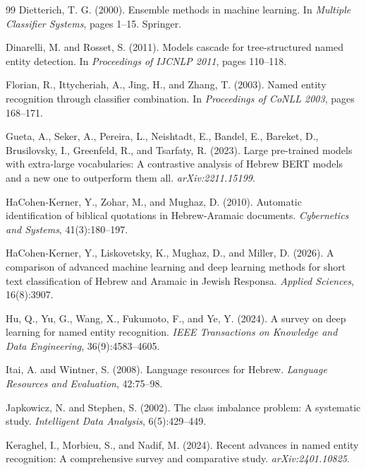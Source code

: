 \documentclass[11pt,a4paper]{article}
\begin{document}
\begin{thebibliography}{99}
Dietterich, T. G. (2000).
Ensemble methods in machine learning.
In \emph{Multiple Classifier Systems}, pages 1--15. Springer.

Dinarelli, M. and Rosset, S. (2011).
Models cascade for tree-structured named entity detection.
In \emph{Proceedings of IJCNLP 2011}, pages 110--118.

Florian, R., Ittycheriah, A., Jing, H., and Zhang, T. (2003).
Named entity recognition through classifier combination.
In \emph{Proceedings of CoNLL 2003}, pages 168--171.

Gueta, A., Seker, A., Pereira, L., Neishtadt, E., Bandel, E., Bareket, D., Brusilovsky, I., Greenfeld, R., and Tsarfaty, R. (2023).
Large pre-trained models with extra-large vocabularies: A contrastive analysis of Hebrew BERT models and a new one to outperform them all.
\emph{arXiv:2211.15199}.

HaCohen-Kerner, Y., Zohar, M., and Mughaz, D. (2010).
Automatic identification of biblical quotations in Hebrew-Aramaic documents.
\emph{Cybernetics and Systems}, 41(3):180--197.

HaCohen-Kerner, Y., Liskovetsky, K., Mughaz, D., and Miller, D. (2026).
A comparison of advanced machine learning and deep learning methods for short text classification of Hebrew and Aramaic in Jewish Responsa.
\emph{Applied Sciences}, 16(8):3907.

Hu, Q., Yu, G., Wang, X., Fukumoto, F., and Ye, Y. (2024).
A survey on deep learning for named entity recognition.
\emph{IEEE Transactions on Knowledge and Data Engineering}, 36(9):4583--4605.

Itai, A. and Wintner, S. (2008).
Language resources for Hebrew.
\emph{Language Resources and Evaluation}, 42:75--98.

Japkowicz, N. and Stephen, S. (2002).
The class imbalance problem: A systematic study.
\emph{Intelligent Data Analysis}, 6(5):429--449.

Keraghel, I., Morbieu, S., and Nadif, M. (2024).
Recent advances in named entity recognition: A comprehensive survey and comparative study.
\emph{arXiv:2401.10825}.


\end{thebibliography}
\end{document}
